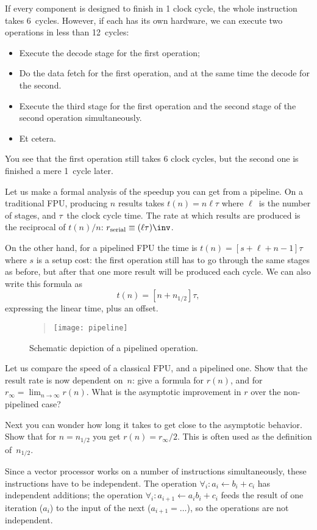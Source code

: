 If every component is designed to finish in 1 clock cycle, the whole
instruction takes 6~cycles. However, if each has its own hardware, we
can execute two operations in less than 12~cycles:
\begin{itemize}
\item Execute the decode stage for the first operation;
\item Do the data fetch for the first operation, and at the same time
  the decode for the second.
\item Execute the third stage for the first operation and the second
  stage of the second operation simultaneously.
\item Et cetera.
\end{itemize}
You see that the first operation still takes 6 clock cycles, but the
second one is finished a mere 1~cycle later. 

Let us make a formal analysis of the speedup you can get from a
pipeline. On a traditional \ac{FPU}, producing $n$ results
takes $t(n)=n\ell\tau$ where $\ell$~is the number of stages, and
$\tau$~the clock cycle time. The rate at which results are produced is
the reciprocal of $t(n)/n$: $r_{\mathrm{serial}}\equiv(\ell\tau)\inv$.

On the other hand, for a pipelined \ac{FPU} the time is
$t(n)=[s+\ell+n-1]\tau$ where $s$ is a setup cost:
the first operation still has to go through the same stages
as before, but after that one more result will be
produced each cycle. We can also write this formula as
\[ t(n)=[n+n_{1/2}]\tau, \]
expressing the linear time, plus an offset.


\begin{figure}[ht]
  \begin{quote}
  \texttt{[image: pipeline]}
  \end{quote}
  \caption{Schematic depiction of a pipelined operation.}
  \label{fig:pipeline}
\end{figure}
\begin{exercise}
  Let us compare the speed of a classical \ac{FPU}, and a pipelined
  one. Show that the result rate is now dependent on~$n$: give a
  formula for $r(n)$, and for
  $r_\infty=\lim_{n\rightarrow\infty}r(n)$. What is the asymptotic
  improvement in $r$ over the non-pipelined case?

  Next you can wonder how long it takes to get close to the asymptotic
  behavior. Show that for $n=n_{1/2}$ you get $r(n)=r_\infty/2$.
  This is often used as the definition of~$n_{1/2}$.
\end{exercise}
Since a vector processor works on a number of instructions
simultaneously, these instructions have to be independent. The
operation $\forall_i\colon a_i\leftarrow b_i+c_i$ has independent
additions; the operation $\forall_i\colon a_{i+1}\leftarrow
a_ib_i+c_i$ feeds the result of one iteration ($a_i$) to the input of
the next ($a_{i+1}=\ldots$), so
the operations are not independent. 

